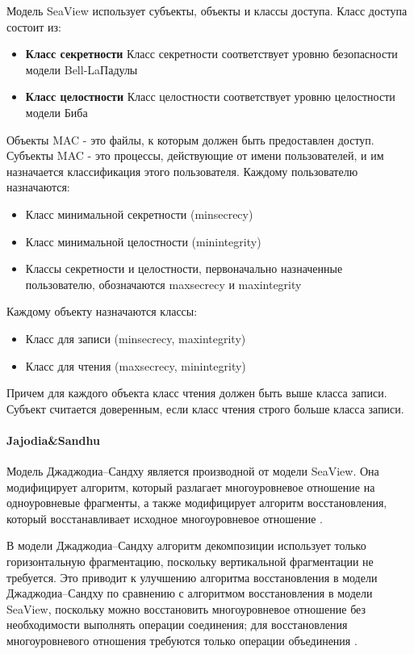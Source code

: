 Модель SeaView использует субъекты, объекты и классы доступа. Класс доступа состоит из:

\begin{itemize}
    \item \textbf{Класс секретности}
    Класс секретности соответствует уровню безопасности модели Bell-LaПадулы
    \item \textbf{Класс целостности}
    Класс целостности соответствует уровню целостности модели Биба
\end{itemize}

Объекты MAC - это файлы, к которым должен быть предоставлен доступ. Субъекты MAC - это процессы, действующие от имени пользователей, и им назначается классификация этого пользователя. Каждому пользователю назначаются:

\begin{itemize}
    \item Класс минимальной секретности (minsecrecy)
    \item Класс минимальной целостности (minintegrity)
    \item Классы секретности и целостности, первоначально назначенные пользователю, обозначаются maxsecrecy и maxintegrity
\end{itemize}

Каждому объекту назначаются классы:

\begin{itemize}
    \item Класс для записи (minsecrecy, maxintegrity)
    \item Класс для чтения (maxsecrecy, minintegrity)
\end{itemize}

Причем для каждого объекта класс чтения должен быть выше класса записи. Субъект считается доверенным, если класс чтения строго больше класса записи.

\paragraph{Jajodia\&Sandhu}

Модель Джаджодиа–Сандху является производной от модели SeaView. Она модифицирует алгоритм, который разлагает 
многоуровневое отношение на одноуровневые фрагменты, а также модифицирует алгоритм восстановления, который 
восстанавливает исходное многоуровневое отношение \autocite{Osama}.

В модели Джаджодиа–Сандху алгоритм декомпозиции использует только горизонтальную фрагментацию, поскольку 
вертикальной фрагментации не требуется. Это приводит к улучшению алгоритма восстановления в модели Джаджодиа–Сандху 
по сравнению с алгоритмом восстановления в модели SeaView, поскольку можно восстановить многоуровневое отношение 
без необходимости выполнять операции соединения; для восстановления многоуровневого отношения требуются только 
операции объединения \autocite{Osama}.

